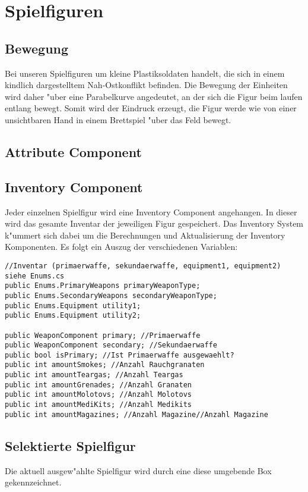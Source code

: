 \chapter{Spielfiguren}

\section{Bewegung}
Bei unseren Spielfiguren um kleine Plastiksoldaten handelt, die sich in einem kindlich dargestelltem Nah-Ostkonflikt befinden. Die Bewegung der Einheiten wird daher "uber eine Parabelkurve angedeutet, an der sich die Figur beim laufen entlang bewegt. Somit wird der Eindruck erzeugt, die Figur werde wie von einer unsichtbaren Hand in einem Brettspiel "uber das Feld bewegt.

\section{Attribute Component}


\section{Inventory Component}
Jeder einzelnen Spielfigur wird eine Inventory Component angehangen. In dieser wird das gesamte Inventar der jeweiligen Figur gespeichert. Das Inventory System k"ummert sich dabei um die Berechnungen und Aktualisierung der Inventory Komponenten.\newline
Es folgt ein Auszug der verschiedenen Variablen:\newline

\begin{lstlisting}[breaklines = true]
//Inventar (primaerwaffe, sekundaerwaffe, equipment1, equipment2) siehe Enums.cs    
public Enums.PrimaryWeapons primaryWeaponType;
public Enums.SecondaryWeapons secondaryWeaponType;
public Enums.Equipment utility1;
public Enums.Equipment utility2;

public WeaponComponent primary; //Primaerwaffe
public WeaponComponent secondary; //Sekundaerwaffe
public bool isPrimary; //Ist Primaerwaffe ausgewaehlt? 
public int amountSmokes; //Anzahl Rauchgranaten
public int amountTeargas; //Anzahl Teargas
public int amountGrenades; //Anzahl Granaten
public int amountMolotovs; //Anzahl Molotovs
public int amountMediKits; //Anzahl Medikits
public int amountMagazines; //Anzahl Magazine//Anzahl Magazine
\end{lstlisting}

\section{Selektierte Spielfigur}
Die aktuell ausgew"ahlte Spielfigur wird durch eine diese umgebende Box gekennzeichnet.
